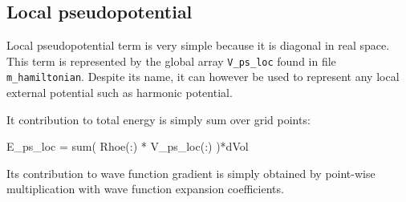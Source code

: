 \subsection{Local pseudopotential}

Local pseudopotential term is very simple because it is diagonal
in real space.
This term is represented by the global array {\tt V\_ps\_loc}
found in file {\tt m\_hamiltonian}. Despite its name, it can
however be used to represent any local external potential
such as harmonic potential.

It contribution to total energy is simply sum over grid
points:
\begin{fortrancode}
E_ps_loc = sum( Rhoe(:) * V_ps_loc(:) )*dVol
\end{fortrancode}

Its contribution to wave function gradient is simply obtained by
point-wise multiplication with wave function expansion
coefficients.


